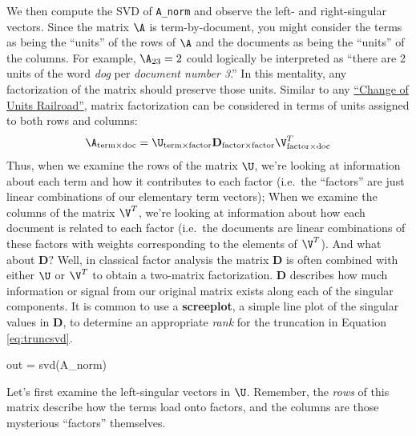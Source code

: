 \documentclass[
]{article}
\newenvironment{Shaded}{\begin{snugshade}}{\end{snugshade}}
\newcommand{\FunctionTok}[1]{\textcolor[rgb]{0.00,0.00,0.00}{#1}}
\newcommand{\NormalTok}[1]{#1}
\newcommand{\OtherTok}[1]{\textcolor[rgb]{0.56,0.35,0.01}{#1}}
\newcommand{\SpecialCharTok}[1]{\textcolor[rgb]{0.00,0.00,0.00}{#1}}
\theoremstyle{definition}
\theoremstyle{definition}
\theoremstyle{definition}
\theoremstyle{definition}
\theoremstyle{remark}
\begin{document}
We then compute the SVD of \texttt{A\_norm} and observe the left- and right-singular vectors. Since the matrix \(\A\) is term-by-document, you might consider the terms as being the ``units'' of the rows of \(\A\) and the documents as being the ``units'' of the columns. For example, \(\A_{23}=2\) could logically be interpreted as ``there are 2 units of the word \emph{dog} per \emph{document number 3}.'' In this mentality, any factorization of the matrix should preserve those units. Similar to any \href{https://www.katmarsoftware.com/articles/railroad-track-unit-conversion.htm}{``Change of Units Railroad''}, matrix factorization can be considered in terms of units assigned to both rows and columns:
\[\A_{\text{term} \times \text{doc}} = \U_{\text{term} \times \text{factor}}\mathbf{D}_{\text{factor} \times \text{factor}}\V^T_{\text{factor} \times \text{doc}}\]
Thus, when we examine the rows of the matrix \(\U\), we're looking at information about each term and how it contributes to each factor (i.e.~the ``factors'' are just linear combinations of our elementary term vectors); When we examine the columns of the matrix \(\V^T\), we're looking at information about how each document is related to each factor (i.e.~the documents are linear combinations of these factors with weights corresponding to the elements of \(\V^T\)). And what about \(\mathbf{D}?\) Well, in classical factor analysis the matrix \(\mathbf{D}\) is often combined with either \(\U\) or \(\V^T\) to obtain a two-matrix factorization. \(\mathbf{D}\) describes how much information or signal from our original matrix exists along each of the singular components. It is common to use a \textbf{screeplot}, a simple line plot of the singular values in \(\mathbf{D}\), to determine an appropriate \emph{rank} for the truncation in Equation \eqref{eq:truncsvd}.

\begin{Shaded}
\begin{Highlighting}[]
\NormalTok{out }\OtherTok{=} \FunctionTok{svd}\NormalTok{(A\_norm)}
\end{Highlighting}
\end{Shaded}

Let's first examine the left-singular vectors in \(\U\). Remember, the \emph{rows} of this matrix describe how the terms load onto factors, and the columns are those mysterious ``factors'' themselves.

\begin{Shaded}
\end{Shaded}
\end{document}
